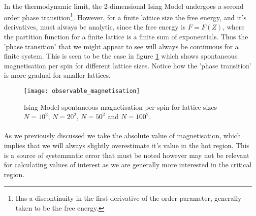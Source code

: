 \documentclass[12pt] {report} %
\begin{document}
			\paragraph{}
				In the thermodynamic limit, the 2-dimensional Ising Model undergoes a second order phase transition\footnote{Has a discontinuity in the first derivative of the order parameter, generally taken to be the free energy.}. However, for a finite lattice size the free energy, and it's derivatives, must always be analytic, since the free energy is $F = F(Z)$, where the partition function for a finite lattice is a finite sum of exponentials. Thus the 'phase transition' that we might appear to see will always be continuous for a finite system. This is seen to be the case in figure \ref{fig:observable_magnetisation} which shows spontaneous magnetisation per spin for different lattice sizes. Notice how the 'phase transition' is more gradual for smaller lattices.
				
				\begin{figure}[H]
					\centering
					\texttt{[image: observable\_magnetisation]}
					\caption{Ising Model spontaneous magnetisation per spin for lattice sizes $N = 10^2$, $N = 20^2$, $N = 50^2$ and $N = 100^2$.}
					\label{fig:observable_magnetisation}
				\end{figure}		
			
			\paragraph{}
				As we previously discussed we take the absolute value of magnetisation, which implies that we will always slightly overestimate it's value in the hot region. This is a source of systemmatic error that must be noted however may not be relevant for calculating values of interest as we are generally more interested in the critical region. 
				
\end{document}
